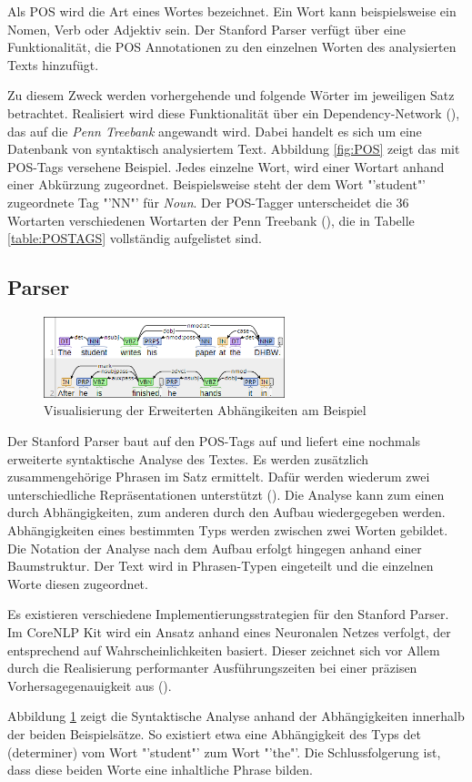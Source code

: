 Als \ac{POS} wird die Art eines Wortes bezeichnet. Ein Wort kann beispielsweise ein Nomen, Verb oder Adjektiv sein. Der Stanford Parser verfügt über eine Funktionalität, die \ac{POS} Annotationen zu den einzelnen Worten des analysierten Texts hinzufügt.\par
Zu diesem Zweck werden vorhergehende und folgende Wörter im jeweiligen Satz betrachtet. Realisiert wird diese Funktionalität über ein Dependency-Network (\cite[vgl.][1]{POSTAGGER}), das auf die \textit{Penn Treebank} angewandt wird. Dabei handelt es sich um eine Datenbank von syntaktisch analysiertem Text. Abbildung \ref{fig:POS} zeigt das mit POS-Tags versehene Beispiel. Jedes einzelne Wort, wird einer Wortart anhand einer Abkürzung zugeordnet. Beispielsweise steht der dem Wort "'student"' zugeordnete Tag "'NN"' für \textit{Noun}. Der POS-Tagger unterscheidet die 36 Wortarten verschiedenen Wortarten der Penn Treebank (\cite[vgl.][3]{PENNTREEBANK}), die in Tabelle \ref{table:POSTAGS} vollständig aufgelistet sind.

\subsection{Parser}
\label{subsec:parser}
\begin{figure}
\includegraphics[width=7cm]{pictures/Parser.png}
\caption{Visualisierung der Erweiterten Abhängikeiten am Beispiel}
\label{fig:ENHDEPS}
\end{figure}
Der Stanford Parser baut auf den POS-Tags auf und liefert eine nochmals erweiterte syntaktische Analyse des Textes. Es werden zusätzlich zusammengehörige Phrasen im Satz ermittelt. Dafür werden wiederum zwei unterschiedliche Repräsentationen unterstützt (\cite[vgl.][4]{STANFORDNLP}). Die Analyse kann zum einen durch Abhängigkeiten, zum anderen durch den Aufbau wiedergegeben werden. Abhängigkeiten eines bestimmten Typs werden zwischen zwei Worten gebildet. Die Notation der Analyse nach dem Aufbau erfolgt hingegen anhand einer Baumstruktur. Der Text wird in Phrasen-Typen eingeteilt und die einzelnen Worte diesen zugeordnet.\par Es existieren verschiedene Implementierungsstrategien für den Stanford Parser. Im CoreNLP Kit wird ein Ansatz anhand eines Neuronalen Netzes verfolgt, der entsprechend auf Wahrscheinlichkeiten basiert. Dieser zeichnet sich vor Allem durch die Realisierung performanter Ausführungszeiten bei einer präzisen Vorhersagegenauigkeit aus (\cite[vgl.][8]{DEPPARSER}).\par
Abbildung \ref{fig:ENHDEPS} zeigt die Syntaktische Analyse anhand der Abhängigkeiten innerhalb der beiden Beispielsätze. So existiert etwa eine Abhängigkeit des Typs det (determiner) vom Wort "'student"' zum Wort "'the"'. Die Schlussfolgerung ist, dass diese beiden Worte eine inhaltliche Phrase bilden.

